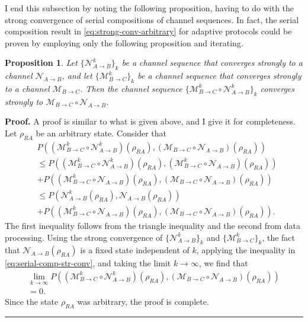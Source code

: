 \documentclass[apsrev,twocolumn]{revtex4-1}%
\newtheorem{proposition}[theorem]{Proposition}
\newenvironment{proof}[1][Proof]{\noindent\textbf{#1.} }{\ \rule{0.5em}{0.5em}}
\begin{document}
I end this subsection by noting the following proposition, having to do with
the strong convergence of serial compositions of channel sequences. In fact,
the serial composition result in \eqref{eq:strong-conv-arbitrary} for adaptive
protocols could be proven by employing only the following proposition and iterating.

\begin{proposition}
\label{prop:sequential-comp} Let $\{\mathcal{N}_{A\rightarrow B}^{k}\}_{k}$ be
a channel sequence that converges strongly to a channel $\mathcal{N}%
_{A\rightarrow B}$, and let $\{\mathcal{M}_{B\rightarrow C}^{k}\}_{k}$ be a
channel sequence that converges strongly to a channel $\mathcal{M}%
_{B\rightarrow C}$. Then the channel sequence $\{\mathcal{M}_{B\rightarrow
C}^{k}\circ\mathcal{N}_{A\rightarrow B}^{k}\}_{k}$ converges strongly to
$\mathcal{M}_{B\rightarrow C}\circ\mathcal{N}_{A\rightarrow B}$.
\end{proposition}

\begin{proof}
A proof is similar to what is given above, and I give it for completeness. Let
$\rho_{RA}$ be an arbitrary state. Consider that%
\begin{align}
&  P((\mathcal{M}_{B\rightarrow C}^{k}\circ\mathcal{N}_{A\rightarrow B}%
^{k})(\rho_{RA}),(\mathcal{M}_{B\rightarrow C}\circ\mathcal{N}_{A\rightarrow
B})(\rho_{RA}))\nonumber\\
&  \leq P((\mathcal{M}_{B\rightarrow C}^{k}\circ\mathcal{N}_{A\rightarrow
B}^{k})(\rho_{RA}),(\mathcal{M}_{B\rightarrow C}^{k}\circ\mathcal{N}%
_{A\rightarrow B})(\rho_{RA}))\nonumber\\
&  +P((\mathcal{M}_{B\rightarrow C}^{k}\circ\mathcal{N}_{A\rightarrow B}%
)(\rho_{RA}),(\mathcal{M}_{B\rightarrow C}\circ\mathcal{N}_{A\rightarrow
B})(\rho_{RA}))\nonumber\\
&  \leq P(\mathcal{N}_{A\rightarrow B}^{k}(\rho_{RA}),\mathcal{N}%
_{A\rightarrow B}(\rho_{RA}))\nonumber\\
&  +P((\mathcal{M}_{B\rightarrow C}^{k}\circ\mathcal{N}_{A\rightarrow B}%
)(\rho_{RA}),(\mathcal{M}_{B\rightarrow C}\circ\mathcal{N}_{A\rightarrow
B})(\rho_{RA})). \label{eq:serial-comp-str-conv}%
\end{align}
The first inequality follows from the triangle inequality and the second from
data processing. Using the strong convergence of $\{\mathcal{N}_{A\rightarrow
B}^{k}\}_{k}$ and $\{\mathcal{M}_{B\rightarrow C}^{k}\}_{k}$, the fact that
$\mathcal{N}_{A\rightarrow B}(\rho_{RA})$ is a fixed state independent of $k$,
applying the inequality in \eqref{eq:serial-comp-str-conv}, and taking the
limit $k\rightarrow\infty$, we find that%
\begin{multline}
\!\!\!\!\lim_{k\rightarrow\infty}P((\mathcal{M}_{B\rightarrow C}^{k}%
\circ\mathcal{N}_{A\rightarrow B}^{k})(\rho_{RA}),(\mathcal{M}_{B\rightarrow
C}\circ\mathcal{N}_{A\rightarrow B})(\rho_{RA}))\\
=0.
\end{multline}
Since the state $\rho_{RA}$ was arbitrary, the proof is complete.
\end{proof}
\end{document}
